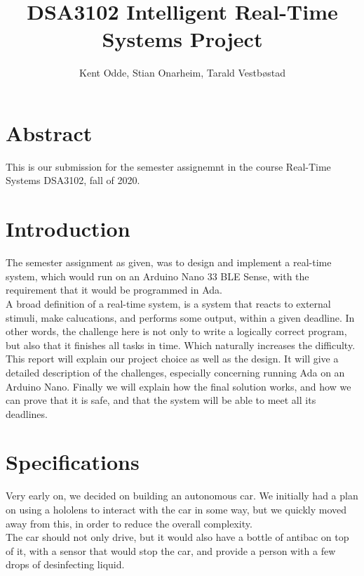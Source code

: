 \documentclass{article}
\author{Kent Odde, Stian Onarheim, Tarald Vestbøstad}
\title{DSA3102 Intelligent Real-Time Systems Project}
\begin{document}
\maketitle

\newpage
\tableofcontents

\newpage
\section{Abstract}
This is our submission for the semester assignemnt in the course Real-Time Systems DSA3102, fall of 2020.

\section{Introduction}
The semester assignment as given, was to design and implement a real-time system, which would run on an Arduino Nano 33 BLE Sense, with the requirement that it would be programmed in Ada.\\

A broad definition of a real-time system, is a system that reacts to external stimuli, make calucations, and performs some output, within a given deadline. In other words, the challenge here is not only to write a logically correct program, but also that it finishes all tasks in time. Which naturally increases the difficulty.\\

This report will explain our project choice as well as the design. It will give a detailed description of the challenges, especially concerning running Ada on an Arduino Nano. Finally we will explain how the final solution works, and how we can prove that it is safe, and that the system will be able to meet all its deadlines.\\

\section{Specifications}

Very early on, we decided on building an autonomous car. We initially had a plan on using a hololens to interact with the car in some way, but we quickly moved away from this, in order to reduce the overall complexity.\\

The car should not only drive, but it would also have a bottle of antibac on top of it, with a sensor that would stop the car, and provide a person with a few drops of desinfecting liquid.\\
\end{document}
